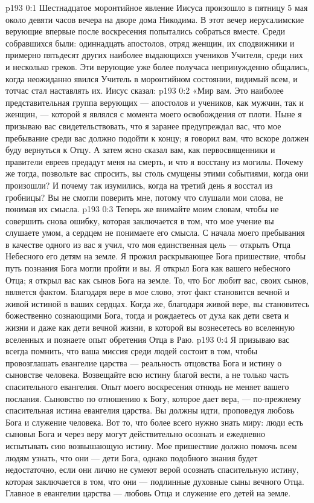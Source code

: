 \author{Комиссия срединников}
\vs p193 0:1 Шестнадцатое моронтийное явление Иисуса произошло в пятницу 5 мая около девяти часов вечера на дворе дома Никодима. В этот вечер иерусалимские верующие впервые после воскресения попытались собраться вместе. Среди собравшихся были: одиннадцать апостолов, отряд женщин, их сподвижники и примерно пятьдесят других наиболее выдающихся учеников Учителя, среди них и несколько греков. Эти верующие уже более получаса непринужденно общались, когда неожиданно явился Учитель в моронтийном состоянии, видимый всем, и тотчас стал наставлять их. Иисус сказал:
\vs p193 0:2 \pc «Мир вам. Это наиболее представительная группа верующих --- апостолов и учеников, как мужчин, так и женщин, --- которой я являлся с момента моего освобождения от плоти. Ныне я призываю вас свидетельствовать, что я заранее предупреждал вас, что мое пребывание среди вас должно подойти к концу; я говорил вам, что вскоре должен буду вернуться к Отцу. А затем ясно сказал вам, как первосвященники и правители евреев предадут меня на смерть, и что я восстану из могилы. Почему же тогда, позвольте вас спросить, вы столь смущены этими событиями, когда они произошли? И почему так изумились, когда на третий день я восстал из гробницы? Вы не смогли поверить мне, потому что слушали мои слова, не понимая их смысла.
\vs p193 0:3 Теперь же внимайте моим словам, чтобы не совершить снова ошибку, которая заключается в том, что мое учение вы слушаете умом, а сердцем не понимаете его смысла. С начала моего пребывания в качестве одного из вас я учил, что моя единственная цель --- открыть Отца Небесного его детям на земле. Я прожил раскрывающее Бога пришествие, чтобы путь познания Бога могли пройти и вы. Я открыл Бога как вашего небесного Отца; я открыл вас как сынов Бога на земле. То, что Бог любит вас, своих сынов, является фактом. Благодаря вере в мое слово, этот факт становится вечной и живой истиной в ваших сердцах. Когда же, благодаря живой вере, вы становитесь божественно сознающими Бога, тогда и рождаетесь от духа как дети света и жизни и даже как дети вечной жизни, в которой вы вознесетесь во вселенную вселенных и познаете опыт обретения Отца в Раю.
\vs p193 0:4 Я призываю вас всегда помнить, что ваша миссия среди людей состоит в том, чтобы провозглашать евангелие царства --- реальность отцовства Бога и истину о сыновстве человека. Возвещайте всю истину благой вести, а не только часть спасительного евангелия. Опыт моего воскресения отнюдь не меняет вашего послания. Сыновство по отношению к Богу, которое дает вера, --- по\hyp{}прежнему спасительная истина евангелия царства. Вы должны идти, проповедуя любовь Бога и служение человека. Вот то, что более всего нужно знать миру: люди есть сыновья Бога и через веру могут действительно осознать и ежедневно испытывать сию возвышающую истину. Мое пришествие должно помочь всем людям узнать, что они --- дети Бога, однако подобного знания будет недостаточно, если они лично не сумеют верой осознать спасительную истину, которая заключается в том, что они --- подлинные духовные сыны вечного Отца. Главное в евангелии царства --- любовь Отца и служение его детей на земле.
